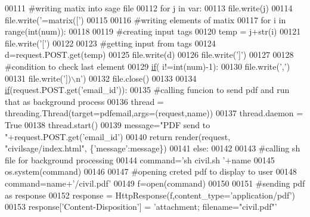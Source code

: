 \begin{DoxyCode}
00111         \textcolor{comment}{#writing matix into sage file}
00112         \textcolor{keywordflow}{for} j \textcolor{keywordflow}{in} var:
00113             file.write(j)
00114             file.write(\textcolor{stringliteral}{'=matrix(['})
00115 
00116             \textcolor{comment}{#writing elements of matix}
00117             \textcolor{keywordflow}{for} i \textcolor{keywordflow}{in} range(int(num)):
00118 
00119                 \textcolor{comment}{#creating input tags}
00120                 temp = j+str(i)
00121                 file.write(\textcolor{stringliteral}{'['})
00122 
00123                 \textcolor{comment}{#getting input from tags}
00124                 d=request.POST.get(temp)
00125                 file.write(d)
00126                 file.write(\textcolor{stringliteral}{']'})
00127 
00128                 \textcolor{comment}{#condition to check last element}
00129                 \hyperlink{bootstrap_8min_8js_ac2d69f5011896c6ed4a54e0dd36f6334}{if}( i!=int(num)-1):
00130                     file.write(\textcolor{stringliteral}{','})
00131             file.write(\textcolor{stringliteral}{'])\(\backslash\)n'})
00132         file.close()
00133 
00134         \hyperlink{bootstrap_8min_8js_ac2d69f5011896c6ed4a54e0dd36f6334}{if}(request.POST.get(\textcolor{stringliteral}{'email\_id'})):
00135             \textcolor{comment}{#calling funcion to send pdf and run that as background process}
00136             thread = threading.Thread(target=pdfemail,args=(request,name))
00137             thread.daemon = \textcolor{keyword}{True}
00138             thread.start()
00139             message=\textcolor{stringliteral}{"PDF send to "}+request.POST.get(\textcolor{stringliteral}{'email\_id'})
00140             \textcolor{keywordflow}{return} render(request, \textcolor{stringliteral}{"civilsage/index.html"}, \{\textcolor{stringliteral}{'message'}:message\})
00141         \textcolor{keywordflow}{else}:
00142 
00143             \textcolor{comment}{#calling sh file for background processing}
00144             command=\textcolor{stringliteral}{'sh  civil.sh '}+name
00145             os.system(command)
00146 
00147             \textcolor{comment}{#opening creted pdf to display to user}
00148             command=name+\textcolor{stringliteral}{'/civil.pdf'}
00149             f=open(command)
00150 
00151             \textcolor{comment}{#sending pdf as response}
00152             response = HttpResponse(f,content\_type=\textcolor{stringliteral}{'application/pdf'})
00153             response[\textcolor{stringliteral}{'Content-Disposition'}] = \textcolor{stringliteral}{'attachment; filename="civil.pdf"'}

\end{DoxyCode}
